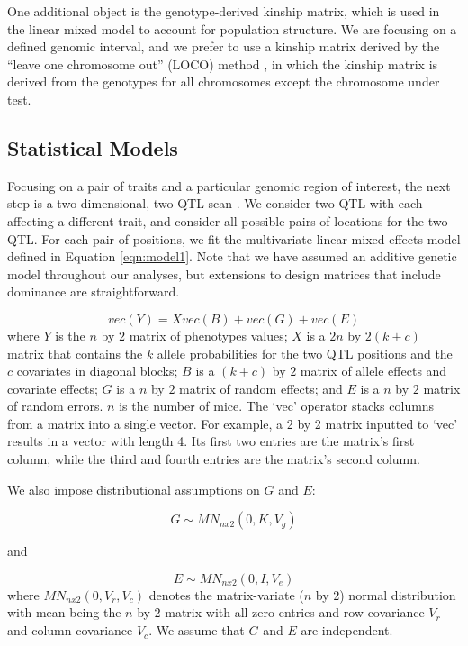 \documentclass[oneside]{book}\usepackage[]{graphicx}\usepackage[]{color}
\begin{document}
One additional object is the genotype-derived kinship matrix, which is
used in the linear mixed model to account for population structure. We
are focusing on a defined genomic interval, and we prefer to use a
kinship matrix derived by the ``leave one chromosome out'' (LOCO)
method \citep{yang2014advantages}, in which the kinship matrix is
derived from the genotypes for all chromosomes except the chromosome
under test.




\subsection{Statistical Models}

Focusing on a pair of traits and a particular genomic region of
interest, the next step is a two-dimensional, two-QTL
scan \citep{jiang1995multiple}. We consider two QTL with each
affecting a different trait, and consider all possible pairs of
locations for the two QTL. For each pair of positions, we fit
the multivariate linear mixed effects model defined in Equation
\ref{eqn:model1}. Note that we have
assumed an additive genetic model throughout our analyses, but
extensions to design matrices that include dominance are
straightforward.


\begin{equation}
vec(Y) = X vec(B) + vec(G) + vec(E)
\label{eqn:model1}
\end{equation}
where $Y$ is the $n$ by $2$ matrix of phenotypes values;
$X$ is a $2n$ by $2(k + c)$
matrix that contains the $k$ allele probabilities for the two QTL
positions and the $c$
covariates in diagonal blocks; $B$ is a $(k + c)$ by $2$ matrix of
allele effects and covariate effects; $G$ is a $n$ by $2$ matrix of
random effects; and $E$ is a $n$ by $2$ matrix of random errors. $n$
is the number of mice. The `vec' operator stacks columns from a matrix
into a single vector. For example, a 2 by 2 matrix inputted to `vec'
results in a vector with length 4. Its first two entries are the
matrix's first column, while the third and fourth entries are the
matrix's second column.


We also impose distributional assumptions on $G$ and $E$:

\begin{equation}
G \sim MN_{n x 2}(0, K, V_g)
\label{eqn:model2}
\end{equation}

and

\begin{equation}
E \sim MN_{nx2}(0, I, V_e)
\label{eqn:model3}
\end{equation}
where $MN_{n x 2}(0, V_r, V_c)$ denotes the matrix-variate ($n$ by 2)
normal distribution with mean being the $n$ by $2$ matrix with all
zero entries and row covariance $V_r$ and column covariance $V_c$. We
assume that $G$ and $E$ are independent.
\end{document}

